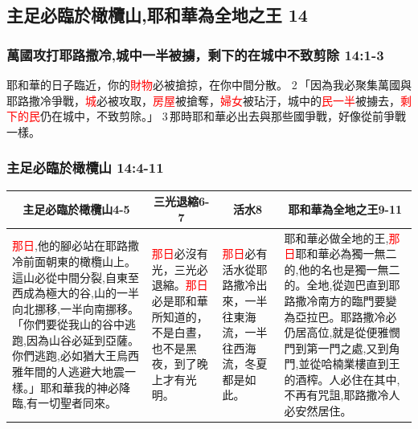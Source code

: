 \subsection{主足必臨於橄欖山,耶和華為全地之王 14}
\subsubsection{萬國攻打耶路撒冷,城中一半被擄，剩下的在城中不致剪除 14:1-3}
耶和華的日子臨近，你的\textcolor{red}{財物}必被搶掠，在你中間分散。 2 「因為我必聚集萬國與耶路撒冷爭戰，\textcolor{red}{城}必被攻取，\textcolor{red}{房屋}被搶奪，\textcolor{red}{婦女}被玷汙，城中的\textcolor{red}{民一半}被擄去，\textcolor{red}{剩下的民}仍在城中，不致剪除。」 3 那時耶和華必出去與那些國爭戰，好像從前爭戰一樣。

\subsubsection{主足必臨於橄欖山 14:4-11}
\begin{table}[H]
\centering
\begin{tabular}{p{6.25cm}|p{2.250cm}|p{}|p{6.250cm}}\hline\hline
\multicolumn{1}{c|}{主足必臨於橄欖山4-5}&\multicolumn{1}{c|}{三光退縮6-7}&\multicolumn{1}{c|}{活水8}&\multicolumn{1}{c}{耶和華為全地之王9-11}\\\hline
\textcolor{red}{那日},他的腳必站在耶路撒冷前面朝東的橄欖山上。這山必從中間分裂,自東至西成為極大的谷,山的一半向北挪移,一半向南挪移。「你們要從我山的谷中逃跑,因為山谷必延到亞薩。你們逃跑,必如猶大王烏西雅年間的人逃避大地震一樣。」耶和華我的神必降臨,有一切聖者同來。
&\textcolor{red}{那日}必沒有光，三光必退縮。\textcolor{red}{那日}必是耶和華所知道的，不是白晝，也不是黑夜，到了晚上才有光明。
&\textcolor{red}{那日}必有活水從耶路撒冷出來，一半往東海流，一半往西海流，冬夏都是如此。
&耶和華必做全地的王,\textcolor{red}{那日}耶和華必為獨一無二的,他的名也是獨一無二的。全地,從迦巴直到耶路撒冷南方的臨門要變為亞拉巴。耶路撒冷必仍居高位,就是從便雅憫門到第一門之處,又到角門,並從哈楠業樓直到王的酒榨。人必住在其中,不再有咒詛,耶路撒冷人必安然居住。
\\\hline
\end{tabular}
\end{table}

